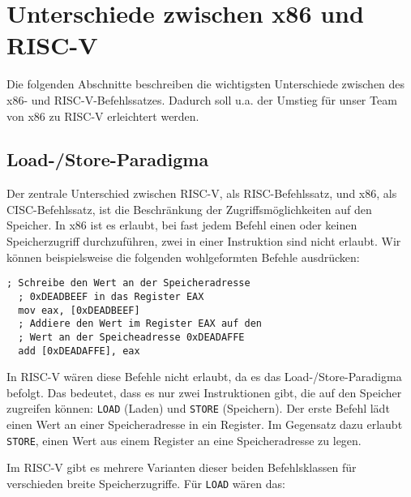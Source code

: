 \section{Unterschiede zwischen x86 und RISC-V}

Die folgenden Abschnitte beschreiben die wichtigsten Unterschiede zwischen des x86- und RISC-V-Befehlssatzes.
Dadurch soll u.a. der Umstieg für unser Team von x86 zu RISC-V erleichtert werden.

\subsection{Load-/Store-Paradigma}

Der zentrale Unterschied zwischen RISC-V, als RISC-Befehlssatz, und x86, als
CISC-Befehlssatz, ist die Beschränkung der
Zugriffsmöglichkeiten auf den Speicher. In x86 ist es erlaubt, bei fast
jedem Befehl einen oder keinen Speicherzugriff durchzuführen,
zwei in einer Instruktion sind nicht erlaubt.
Wir können beispielsweise
die folgenden wohlgeformten Befehle ausdrücken:

\begin{lstlisting}[style=x86Assembler]
  ; Schreibe den Wert an der Speicheradresse
  ; 0xDEADBEEF in das Register EAX
  mov eax, [0xDEADBEEF]
  ; Addiere den Wert im Register EAX auf den
  ; Wert an der Speicheadresse 0xDEADAFFE
  add [0xDEADAFFE], eax
\end{lstlisting}

In RISC-V wären diese Befehle nicht erlaubt, da es das Load-/Store-Paradigma
befolgt. Das bedeutet, dass es nur zwei Instruktionen gibt, die auf den Speicher
zugreifen können: \lstinline[style=risc-v_Assembler]!LOAD! (Laden) und \lstinline[style=risc-v_Assembler]!STORE! (Speichern). Der erste
Befehl lädt einen Wert an einer Speicheradresse in ein Register. Im
Gegensatz dazu erlaubt \lstinline[style=risc-v_Assembler]!STORE!, einen Wert aus einem Register an eine
Speicheradresse zu legen.

Im RISC-V gibt es mehrere Varianten dieser beiden Befehlsklassen für
verschieden breite Speicherzugriffe. Für \lstinline[style=risc-v_Assembler]!LOAD! wären das:

